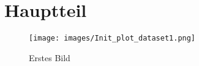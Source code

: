 
\chapter{Hauptteil}
\begin{figure}[htbp]
  \centering
     \texttt{[image: images/Init\_plot\_dataset1.png]}
  \caption{Erstes Bild}
  \label{fig:Bild1}
\end{figure}
